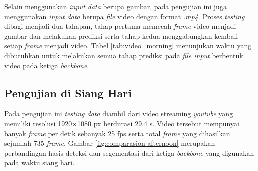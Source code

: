 \begin{table}[!h]
\begin{minipage}[b]{\textwidth}
\begin{tabular}{|l|c|c|c|}
		\end{tabular}
	\end{minipage}
	\label{tab:evaluate-morning}
\end{table}

Selain menggunakan \textit{input data} berupa gambar, pada pengujian ini juga menggunakan \textit{input data} berupa \textit{file} video dengan format \textit{.mp4}. Proses \textit{testing} dibagi menjadi dua tahapan, tahap pertama memecah \textit{frame} video menjadi gambar dan melakukan prediksi serta tahap kedua menggabungkan kembali setiap \textit{frame} menjadi video. Tabel \ref{tab:video_morning} menunjukan waktu yang dibutuhkan untuk melakukan semua tahap prediksi pada \textit{file input} berbentuk video pada ketiga \textit{backbone}.

\begin{table}[h]
	\label{tab:video_morning}
\end{table}

\subsection{Pengujian di Siang Hari}
\label{subsec:siang}

Pada pengujian ini \textit{testing data} diambil dari video streaming \textit{youtube}\citep{test-siang} yang memiliki resolusi 1920$\times$1080 px berdurasi 29.4 s. Video tersebut mempunyai banyak \textit{frame} per detik sebanyak 25 fps serta total \textit{frame} yang dihasilkan sejumlah 735 \textit{frame}. Gambar \ref{fig:comparasion-afternoon} merupakan perbandingan hasis deteksi dan segementasi dari ketiga \textit{backbone} yang digunakan pada waktu siang hari.

